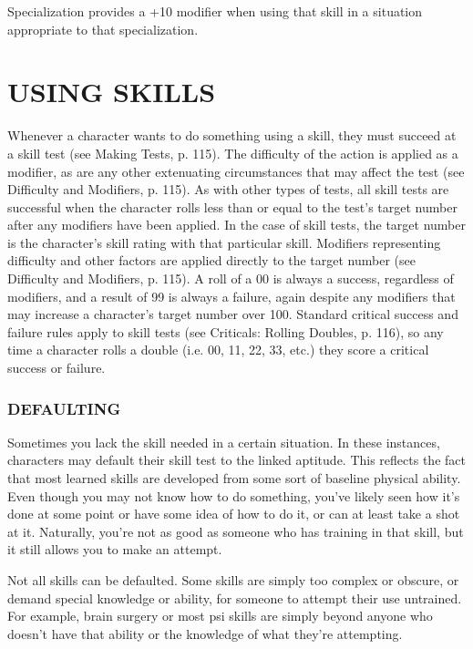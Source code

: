 Specialization provides a +10 modifier when using that skill in a situation appropriate to that specialization. 







\section{USING SKILLS} Whenever a character wants to do something using a skill, they must succeed at a skill test (see Making Tests, p. 115). The difficulty of the action is applied as a modifier, as are any other extenuating circumstances that may affect the test (see Difficulty and Modifiers, p. 115). As with other types of tests, all skill tests are successful when the character rolls less than or equal to the test’s target number after any modifiers have been applied. In the case of skill tests, the target number is the character’s skill rating with that particular skill. Modifiers representing difficulty and other factors are applied directly to the target number (see Difficulty and Modifiers, p. 115). A roll of a 00 is always a success, regardless of modifiers, and a result of 99 is always a failure, again despite any modifiers that may increase a character’s target number over 100. Standard critical success and failure rules apply to skill tests (see Criticals: Rolling Doubles, p. 116), so any time a character rolls a double (i.e. 00, 11, 22, 33, etc.) they score a critical success or failure. 



\subsubsection{DEFAULTING} Sometimes you lack the skill needed in a certain situation. In these instances, characters may default their skill test to the linked aptitude. This reflects the fact that most learned skills are developed from some sort of baseline physical ability. Even though you may not know how to do something, you’ve likely seen how it’s done at some point or have some idea of how to do it, or can at least take a shot at it. Naturally, you’re not as good as someone who has training in that skill, but it still allows you to make an attempt. 

Not all skills can be defaulted. Some skills are simply too complex or obscure, or demand special knowledge or ability, for someone to attempt their use untrained. For example, brain surgery or most psi skills are simply beyond anyone who doesn’t have that ability or the knowledge of what they’re attempting. 

